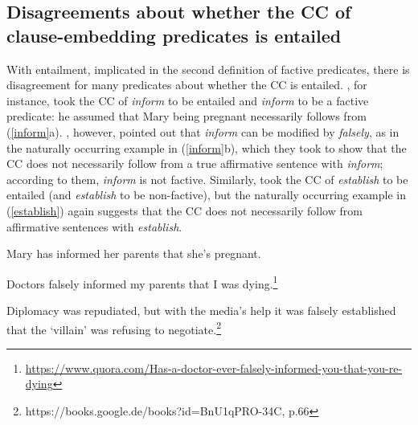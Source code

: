 \documentclass[11pt,fleqn]{article}
\newcommand{\6}{\mbox{$[\hspace*{-.6mm}[$}}
\newcommand{\9}{\mbox{$]\hspace*{-.6mm}]$}}
\begin{document}
\subsection{Disagreements about whether the CC of clause-embedding predicates is entailed}\label{s13}

With entailment, implicated in the second definition of factive predicates, there is disagreement for many predicates about whether the CC is entailed. \citet[139]{schlenker10}, for instance, took the CC of {\em inform} to be entailed and {\em inform} to be a factive predicate: he assumed that Mary being pregnant necessarily follows from (\ref{inform}a). \citet[76]{anand-hacquard2014}, however, pointed out that {\em inform} can be modified by {\em falsely}, as in the naturally occurring example in (\ref{inform}b), which they took to show that the CC does not necessarily follow from a true affirmative sentence with {\em inform}; according to them, {\em inform} is not factive. Similarly, \citet{swanson2012} took the CC of {\em establish} to be entailed (and {\em establish} to be non-factive), but the naturally occurring example in (\ref{establish}) again suggests that the CC does not necessarily follow from affirmative sentences with {\em establish}.

\begin{exe}
\ex\label{inform} 

\begin{xlist}

\ex Mary has informed her parents that she's pregnant.

\ex Doctors falsely informed my parents that I was dying.\footnote{\url{https://www.quora.com/Has-a-doctor-ever-falsely-informed-you-that-you-re-dying}}

\end{xlist}

\ex\label{establish} Diplomacy was repudiated, but with the media's help it was falsely established that the `villain' was refusing to negotiate.\footnote{https://books.google.de/books?id=BnU1qPRO-34C, p.66}
\end{exe}



\end{document}

